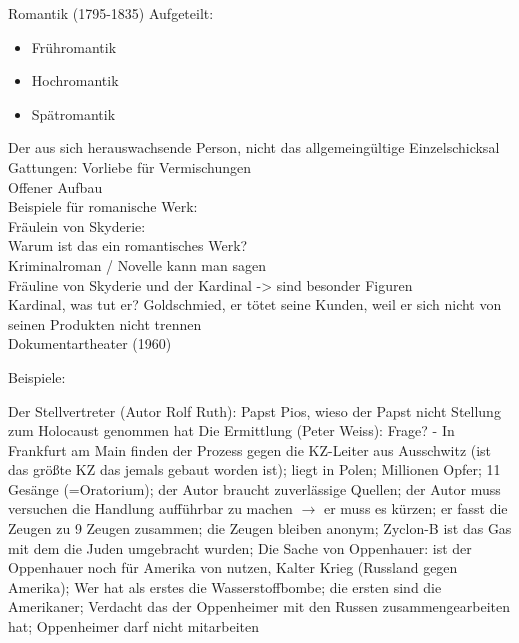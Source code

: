 \documentclass[a4paper]{article}
\begin{document}
Romantik (1795-1835)
Aufgeteilt:
\begin{itemize}
\item Frühromantik
\item Hochromantik
\item Spätromantik
\end{itemize}

Der aus sich herauswachsende Person, nicht das allgemeingültige Einzelschicksal\\
Gattungen: Vorliebe für Vermischungen\\
Offener Aufbau\\

Beispiele für romanische Werk:\\

Fräulein von Skyderie:\\
Warum ist das ein romantisches Werk?\\
Kriminalroman / Novelle kann man sagen\\
Fräuline von Skyderie und der Kardinal -> sind besonder Figuren\\
Kardinal, was tut er? Goldschmied, er tötet seine Kunden, weil er sich nicht von seinen Produkten nicht trennen\\

Dokumentartheater (1960)

Beispiele:

Der Stellvertreter (Autor Rolf Ruth): Papst Pios, wieso der Papst nicht Stellung zum Holocaust genommen hat
Die Ermittlung (Peter Weiss): Frage? - In Frankfurt am Main finden der Prozess gegen die KZ-Leiter aus Ausschwitz (ist das größte KZ das jemals gebaut worden ist); liegt in Polen; Millionen Opfer; 11 Gesänge (=Oratorium); der Autor braucht zuverlässige Quellen; der Autor muss versuchen die Handlung aufführbar zu machen $\rightarrow$ er muss es kürzen; er fasst die Zeugen zu 9 Zeugen zusammen; die Zeugen bleiben anonym; Zyclon-B ist das Gas mit dem die Juden umgebracht wurden; 
Die Sache von Oppenhauer: ist der Oppenhauer noch für Amerika von nutzen, Kalter Krieg (Russland gegen Amerika); Wer hat als erstes die Wasserstoffbombe; die ersten sind die Amerikaner; Verdacht das der Oppenheimer mit den Russen zusammengearbeiten hat; Oppenheimer darf nicht mitarbeiten 
\end{document}

